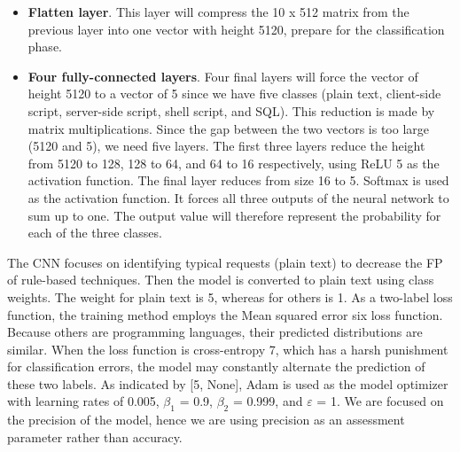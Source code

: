 \begin{itemize}
	\item \textbf{Flatten layer}. This layer will compress the 10 x 512 matrix from the previous layer into one vector with height 5120, prepare for the classification phase. 
	\item \textbf{Four fully-connected layers}. Four final layers will force the vector of height 5120 to a vector of 5 since we have five classes (plain text, client-side script, server-side script, shell script, and SQL). This reduction is made by matrix multiplications. Since the gap between the two vectors is too large (5120 and 5), we need five layers. The first three layers reduce the height from 5120 to 128, 128 to 64, and 64 to 16 respectively, using ReLU 5 as the activation function. The final layer reduces from size 16 to 5. Softmax is used as the activation function. It forces all three outputs of the neural network to sum up to one. The output value will therefore represent the probability for each of the three classes.
\end{itemize}
\hspace{0.5cm}The CNN focuses on identifying typical requests (plain text) to decrease the FP of rule-based techniques. Then the model is converted to plain text using class weights. The weight for plain text is 5, whereas for others is 1. As a two-label loss function, the training method employs the Mean squared error six loss function. Because others are programming languages, their predicted distributions are similar. When the loss function is cross-entropy 7, which has a harsh punishment for classification errors, the model may constantly alternate the prediction of these two labels. As indicated by [5, None], Adam is used as the model optimizer with learning rates of 0.005, $\beta_1$ = 0.9, $\beta_2$ = 0.999, and $\varepsilon$ = 1. We are focused on the precision of the model, hence we are using precision as an assessment parameter rather than accuracy.

